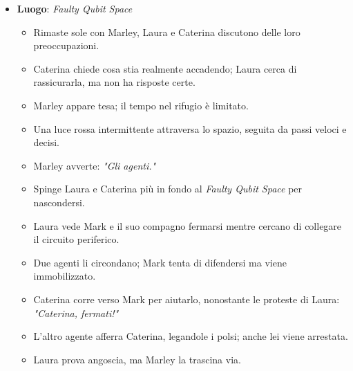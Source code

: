\begin{itemize}
    \item \textbf{Luogo}: \emph{Faulty Qubit Space}
    \begin{itemize}
        \item Rimaste sole con Marley, Laura e Caterina discutono delle loro preoccupazioni.
        \item Caterina chiede cosa stia realmente accadendo; Laura cerca di rassicurarla, ma non ha risposte certe.
        \item Marley appare tesa; il tempo nel rifugio è limitato.
    \end{itemize}
    
    \begin{itemize}
        \item Una luce rossa intermittente attraversa lo spazio, seguita da passi veloci e decisi.
        \item Marley avverte: \emph{"Gli agenti."}
        \item Spinge Laura e Caterina più in fondo al \emph{Faulty Qubit Space} per nascondersi.
        \item Laura vede Mark e il suo compagno fermarsi mentre cercano di collegare il circuito periferico.
        \item Due agenti li circondano; Mark tenta di difendersi ma viene immobilizzato.
        \item Caterina corre verso Mark per aiutarlo, nonostante le proteste di Laura: \emph{"Caterina, fermati!"}
        \item L'altro agente afferra Caterina, legandole i polsi; anche lei viene arrestata.
        \item Laura prova angoscia, ma Marley la trascina via.
    \end{itemize}
\end{itemize}



